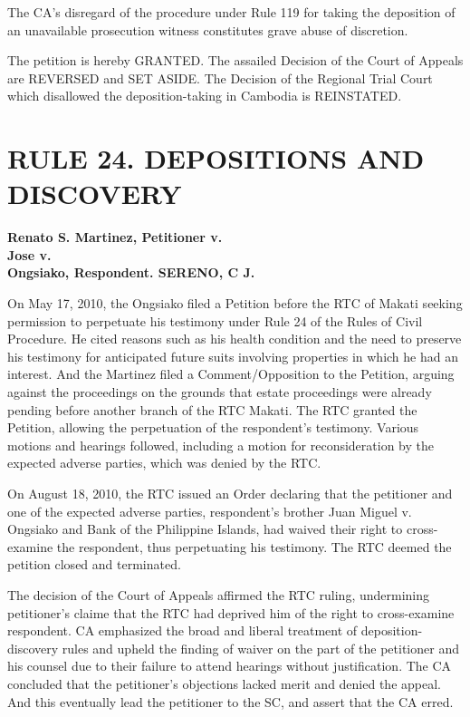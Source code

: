 \documentclass[
12pt,
oneside,
onehalfspacing,
headsepline
]{DigestCollection}
\begin{document}
The CA's disregard of the procedure under Rule 119 for taking the deposition of an unavailable prosecution witness constitutes grave abuse of discretion.

The petition is hereby GRANTED. The assailed Decision of the Court of Appeals are REVERSED and SET ASIDE. The Decision of the Regional Trial Court which disallowed the deposition-taking in Cambodia is REINSTATED.

\chapter{RULE 24. DEPOSITIONS AND DISCOVERY }
\label{ea0b6880-0a12-11ef-932c-63c852f65e48}


\label{1f802120-0a10-11ef-932c-63c852f65e48}


\noindent\textbf{Renato S. Martinez, Petitioner v. \\Jose v. \\Ongsiako, Respondent. SERENO, C J.}\vspace{0.4cm}

On May 17, 2010, the Ongsiako filed a Petition before the RTC of Makati seeking permission to perpetuate his testimony under Rule 24 of the Rules of Civil Procedure. He cited reasons such as his health condition and the need to preserve his testimony for anticipated future suits involving properties in which he had an interest. And the Martinez filed a Comment/Opposition to the Petition, arguing against the proceedings on the grounds that estate proceedings were already pending before another branch of the RTC Makati. The RTC granted the Petition, allowing the perpetuation of the respondent's testimony. Various motions and hearings followed, including a motion for reconsideration by the expected adverse parties, which was denied by the RTC.

On August 18, 2010, the RTC issued an Order declaring that the petitioner and one of the expected adverse parties, respondent's brother Juan Miguel v. \\Ongsiako and Bank of the Philippine Islands, had waived their right to cross-examine the respondent, thus perpetuating his testimony. The RTC deemed the petition closed and terminated.

The decision of the Court of Appeals affirmed the RTC ruling, undermining petitioner's claime that the RTC had deprived him of the right to cross-examine respondent. CA emphasized the broad and liberal treatment of deposition-discovery rules and upheld the finding of waiver on the part of the petitioner and his counsel due to their failure to attend hearings without justification. The CA concluded that the petitioner's objections lacked merit and denied the appeal. And this eventually lead the petitioner to the SC, and assert that the CA erred. 
\end{document}
